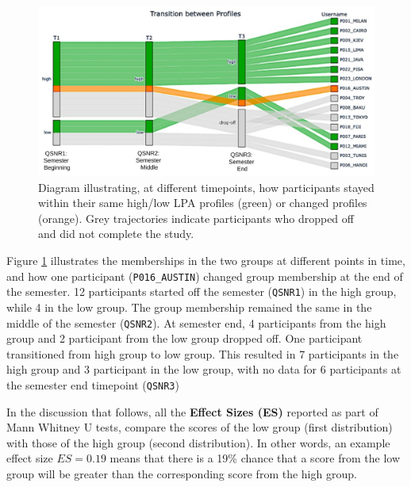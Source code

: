\documentclass[letterpaper, nobind]{templates/ociamthesis}
\begin{document}
\begin{figure}

{\centering \includegraphics[width=1\linewidth]{figs/lpa-profile-transitions} 

}

\caption[LPA Profile Transitions.]{Diagram illustrating, at different timepoints, how participants stayed within their same high/low LPA profiles (green) or changed profiles (orange). Grey trajectories indicate participants who dropped off and did not complete the study.}\label{fig:lpa-profile-transitions}
\end{figure}





Figure \ref{fig:lpa-profile-transitions} illustrates the memberships in the two groups at different points in time, and how one participant (\texttt{P016\_AUSTIN}) changed group membership at the end of the semester.
12 participants started off the semester (\texttt{QSNR1}) in the high group, while 4 in the low group.
The group membership remained the same in the middle of the semester (\texttt{QSNR2}).
At semester end, 4 participants from the high group and 2 participant from the low group dropped off.
One participant transitioned from high group to low group.
This resulted in 7 participants in the high group and 3 participant in the low group, with no data for 6 participants at the semester end timepoint (\texttt{QSNR3})

In the discussion that follows, all the \textbf{Effect Sizes (ES)} reported as part of Mann Whitney U tests, compare the scores of the low group (first distribution) with those of the high group (second distribution).
In other words, an example effect size \(ES=0.19\) means that there is a 19\% chance that a score from the low group will be greater than the corresponding score from the high group.
\end{document}
